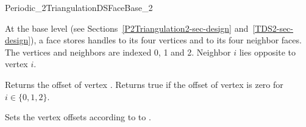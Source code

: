 

\begin{ccRefConcept}{Periodic_2TriangulationDSFaceBase_2}


\ccDefinition
  
At the base level (see Sections~\ref{P2Triangulation2-sec-design} 
and~\ref{TDS2-sec-design}), a face stores handles to its four vertices
and to its four neighbor faces.  The vertices and neighbors are
indexed 0, 1 and 2. Neighbor $i$ lies opposite to vertex $i$.

\ccRefines {}


\ccAccessFunctions
{}

{Returns the offset of vertex .
}
\ccGlue
{}
{Returns true if the offset of vertex  is zero for $i \in \{0, 1, 2\}$.}


{Sets the vertex offsets according to  to .}

\ccHasModels


\ccSeeAlso

\\
\\



\end{ccRefConcept}
